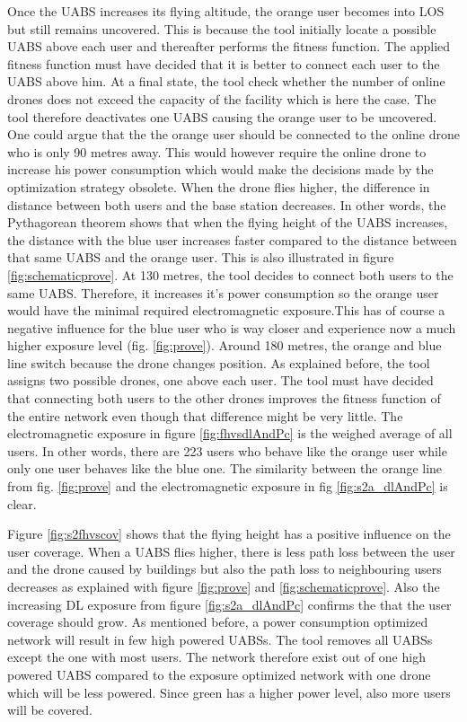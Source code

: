 Once the \gls{UABS} increases its flying altitude, the orange user becomes into \gls{LOS} but still remains uncovered. This is because the tool initially locate a possible 
\gls{UABS} above each user and thereafter performs the  fitness function. The applied fitness function must have decided that it is better to connect 
each user to the \gls{UABS} above him. At a final state, the tool check whether the number of online drones does not exceed the capacity of the facility
which is here the case. The tool therefore deactivates one \gls{UABS} causing the orange user to be uncovered. One could argue that the 
the orange user should be connected to the online drone who is only 90 metres away. This would however require the online drone to increase his power consumption which 
would make the decisions made by the optimization strategy obsolete.
When the drone flies higher, the difference in distance between both users and the base station decreases. In other words, the Pythagorean theorem shows that when the flying height of the 
\gls{UABS} increases, the distance with the blue user increases faster compared to the distance between that same \gls{UABS} and the orange user. This is also illustrated in figure \ref{fig:schematicprove}.
At 130 metres, the tool decides to connect both users to the same \gls{UABS}. Therefore, it increases it's power consumption so the orange user would  have the minimal 
required electromagnetic exposure.This has of course a negative influence for the blue user who is way closer and experience now a much higher exposure level  (fig. \ref{fig:prove}).
Around 180 metres, the  orange and blue line switch because the drone changes position. As explained before, the tool assigns two possible drones, one above 
each user. The tool must have decided that connecting both users to the other drones improves the fitness function of the entire network even though that difference might be 
very little.
The electromagnetic exposure in figure \ref{fig:fhvsdlAndPc} is the weighed average of all users. In other words, there are 223 users who behave like the  orange user while only
one user behaves like the blue one. The similarity between the orange line from fig. \ref{fig:prove}  and  the electromagnetic exposure in fig  \ref{fig:s2a_dlAndPc} is clear.

Figure  \ref{fig:s2fhvscov} shows that the flying height has a positive influence on the user coverage. 
When a \gls{UABS} flies higher, there is less path loss between the user and the drone caused by buildings but also the path loss to neighbouring 
users decreases as explained 
with figure \ref{fig:prove} and \ref{fig:schematicprove}. 
Also the increasing \gls{DL} exposure  from figure \ref{fig:s2a_dlAndPc} confirms the that the
user coverage should grow.
As mentioned before, a power consumption optimized network will result in few high powered \gls{UABS}s. 
The tool removes all \gls{UABS}s except the one with most users. 
The network therefore exist out of one high powered \gls{UABS} compared to the exposure optimized network with one drone which 
will be less powered. Since green has a higher power level, also more users will be covered.

